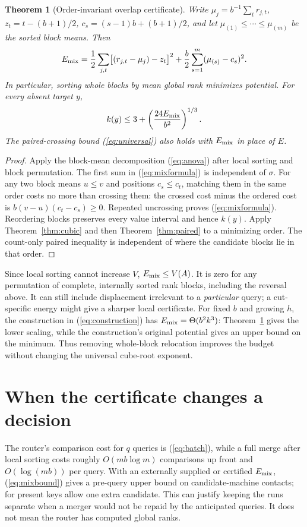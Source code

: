 \documentclass[10pt,letterpaper]{article}
\newtheorem{theorem}{Theorem}
\begin{document}
\begin{theorem}[Order-invariant overlap certificate]\label{thm:mix}
 Write $\mu_j=b^{-1}\sum_t r_{j,t}$, $z_t=t-(b+1)/2$, $c_s=(s-1)b+(b+1)/2$, and let $\mu_{(1)}\le\cdots\le\mu_{(m)}$ be the sorted block means. Then
 \begin{equation}\label{eq:mixformula}
 E_{\rm mix}=\frac12\sum_{j,t}\bigl[(r_{j,t}-\mu_j)-z_t\bigr]^2
 +\frac b2\sum_{s=1}^{m}(\mu_{(s)}-c_s)^2.
 \end{equation}
 In particular, sorting whole blocks by mean global rank minimizes potential. For every absent target $y$,
 \begin{equation}\label{eq:mixbound}
 k(y)\le 3+\left(\frac{24E_{\rm mix}}{b^2}\right)^{1/3}.
 \end{equation}
 The paired-crossing bound (\ref{eq:universal}) also holds with $E_{\rm mix}$ in place of $E$.
\end{theorem}
\begin{proof}
Apply the block-mean decomposition (\ref{eq:anova}) after local sorting and block permutation. The first sum in (\ref{eq:mixformula}) is independent of $\sigma$. For any two block means $u\le v$ and positions $c_s\le c_t$, matching them in the same order costs no more than crossing them: the crossed cost minus the ordered cost is $b(v-u)(c_t-c_s)\ge0$. Repeated uncrossing proves (\ref{eq:mixformula}). Reordering blocks preserves every value interval and hence $k(y)$. Apply Theorem~\ref{thm:cubic} and then Theorem~\ref{thm:paired} to a minimizing order. The count-only paired inequality is independent of where the candidate blocks lie in that order.
\end{proof}

Since local sorting cannot increase $V$, $E_{\rm mix}\le V(A)$. It is zero for any permutation of complete, internally sorted rank blocks, including the reversal above. It can still include displacement irrelevant to a \emph{particular} query; a cut-specific energy might give a sharper local certificate. For fixed $b$ and growing $h$, the construction in (\ref{eq:construction}) has $E_{\rm mix}=\Theta(b^2k^3)$: Theorem~\ref{thm:mix} gives the lower scaling, while the construction's original potential gives an upper bound on the minimum. Thus removing whole-block relocation improves the budget without changing the universal cube-root exponent.

\section{When the certificate changes a decision}
The router's comparison cost for $q$ queries is (\ref{eq:batch}), while a full merge after local sorting costs roughly $O(mb\log m)$ comparisons up front and $O(\log(mb))$ per query. With an externally supplied or certified $E_{\rm mix}$, (\ref{eq:mixbound}) gives a pre-query upper bound on candidate-machine contacts; for present keys allow one extra candidate. This can justify keeping the runs separate when a merger would not be repaid by the anticipated queries. It does not mean the router has computed global ranks.
\end{document}
